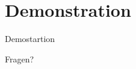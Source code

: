 \section{Demonstration}
	
\begin{frame}
\centering\huge Demostartion
\end{frame}

\begin{frame}
\centering\huge Fragen?
\end{frame}